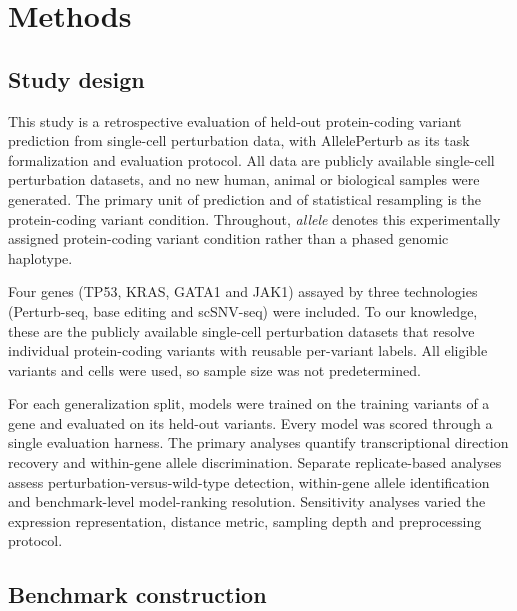 \documentclass[11pt,letterpaper]{article}
\begin{document}
\section*{Methods}

\subsection*{Study design}

This study is a retrospective evaluation of held-out protein-coding variant prediction from single-cell perturbation data, with AllelePerturb as its task formalization and evaluation protocol. All data are publicly available single-cell perturbation datasets, and no new human, animal or biological samples were generated. The primary unit of prediction and of statistical resampling is the protein-coding variant condition. Throughout, \textit{allele} denotes this experimentally assigned protein-coding variant condition rather than a phased genomic haplotype.

Four genes (TP53, KRAS, GATA1 and JAK1) assayed by three technologies (Perturb-seq, base editing and scSNV-seq) were included. To our knowledge, these are the publicly available single-cell perturbation datasets that resolve individual protein-coding variants with reusable per-variant labels. All eligible variants and cells were used, so sample size was not predetermined.

For each generalization split, models were trained on the training variants of a gene and evaluated on its held-out variants. Every model was scored through a single evaluation harness. The primary analyses quantify transcriptional direction recovery and within-gene allele discrimination. Separate replicate-based analyses assess perturbation-versus-wild-type detection, within-gene allele identification and benchmark-level model-ranking resolution. Sensitivity analyses varied the expression representation, distance metric, sampling depth and preprocessing protocol.

\subsection*{Benchmark construction}
\end{document}
